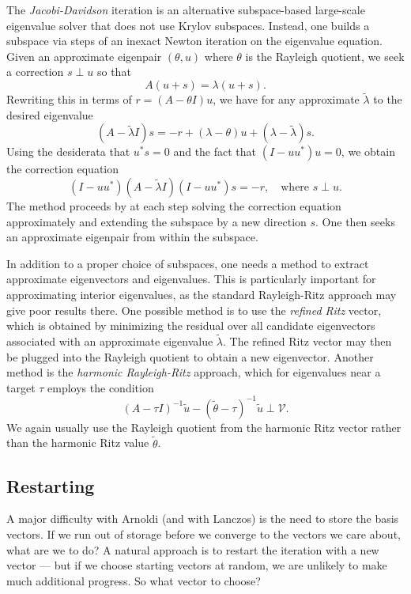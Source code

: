 \documentclass[12pt, leqno]{article} %
\begin{document}
The {\em Jacobi-Davidson} iteration is an alternative subspace-based
large-scale eigenvalue solver that does not use Krylov subspaces.
Instead, one builds a subspace via steps of an inexact Newton iteration
on the eigenvalue equation.  Given an approximate eigenpair $(\theta,u)$
where $\theta$ is the Rayleigh quotient, we seek a correction $s \perp u$
so that
\[
  A(u+s) = \lambda (u+s).
\]
Rewriting this in terms of $r = (A-\theta I) u$, we have for any
approximate $\tilde{\lambda}$ to the desired eigenvalue
\[
  (A-\tilde{\lambda} I) s = -r + (\lambda-\theta) u + (\lambda-\tilde{\lambda}) s.
\]
Using the desiderata that $u^* s = 0$ and the fact that $(I-uu^*) u = 0$,
we obtain the correction equation
\[
  (I-uu^*) (A-\tilde{\lambda} I)(I-uu^*) s = -r, \quad \mbox{where } s \perp u.
\]
The method proceeds by at each step solving the correction equation
approximately and extending the subspace by a new direction $s$.
One then seeks an approximate eigenpair from within the subspace.

In addition to a proper choice of subspaces, one needs a method to
extract approximate eigenvectors and eigenvalues.  This is particularly
important for approximating interior eigenvalues, as the standard
Rayleigh-Ritz approach may give poor results there.  One possible
method is to use the {\em refined Ritz} vector, which is obtained by
minimizing the residual over all candidate eigenvectors associated
with an approximate eigenvalue $\tilde{\lambda}$.  The refined Ritz
vector may then be plugged into the Rayleigh quotient to obtain a
new eigenvector.  Another method is the {\em harmonic Rayleigh-Ritz}
approach, which for eigenvalues near a target $\tau$ employs the
condition
\[
  (A-\tau I)^{-1} \tilde{u} - (\tilde{\theta}-\tau)^{-1} \tilde{u} \perp \mathcal{V}.
\]
We again usually use the Rayleigh quotient from the harmonic Ritz vector
rather than the harmonic Ritz value $\tilde{\theta}$.

\subsection{Restarting}

A major difficulty with Arnoldi (and with Lanczos) is the need to
store the basis vectors.  If we run out of storage before we converge
to the vectors we care about, what are we to do?  A natural approach
is to restart the iteration with a new vector --- but if we choose
starting vectors at random, we are unlikely to make much additional
progress.  So what vector to choose?
\end{document}
